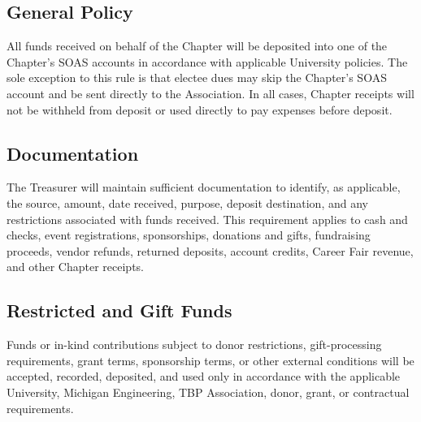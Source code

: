 
\subsection{General Policy} \label{VIII.1}
All funds received on behalf of the Chapter will be deposited into one of the Chapter’s SOAS accounts in accordance with applicable University policies. 
The sole exception to this rule is that electee dues may skip the Chapter’s SOAS account and be sent directly to the Association. 
In all cases, Chapter receipts will not be withheld from deposit or used directly to pay expenses before deposit.

\subsection{Documentation} \label{VIII.2}
The Treasurer will maintain sufficient documentation to identify, as applicable, the source, amount, date received, purpose, deposit destination, 
and any restrictions associated with funds received. This requirement applies to cash and checks, event registrations, sponsorships, donations and gifts, fundraising proceeds, 
vendor refunds, returned deposits, account credits, Career Fair revenue, and other Chapter receipts.

\subsection{Restricted and Gift Funds} \label{VIII.3}
Funds or in-kind contributions subject to donor restrictions, gift-processing requirements, grant terms, sponsorship terms, or other external conditions will be 
accepted, recorded, deposited, and used only in accordance with the applicable University, Michigan Engineering, TBP Association, donor, grant, or contractual requirements.